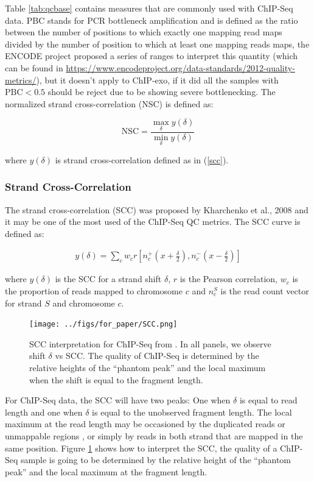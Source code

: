 \documentclass[11pt]{article}\usepackage[]{graphicx}\usepackage[]{color}
\begin{document}
Table \ref{tab:qcbase} contains measures that are commonly used with
ChIP-Seq data. PBC stands for PCR bottleneck amplification and is
defined as the ratio between the number of positions to which exactly
one mapping read maps divided by the number of position to which at
least one mapping reads maps, the ENCODE project proposed a series of
ranges to interpret this quantity (which can be found in
\url{https://www.encodeproject.org/data-standards/2012-quality-metrics/}),
but it doesn't apply to ChIP-exo, if it did all the samples with
$\mbox{PBC} < 0.5$ should be reject due to be showing severe
bottlenecking. The normalized strand cross-correlation (NSC) is
defined as:

\[
\mbox{NSC} = \frac{ \max_\delta y(\delta)}{\min_\delta y(\delta)}
\]

where $y(\delta)$ is strand cross-correlation defined as in (\ref{scc}). 

\subsubsection{Strand Cross-Correlation}
\label{sec:scc}

The strand cross-correlation (SCC) was proposed by Kharchenko et al.,
2008 \cite{strandcc} and it may be one of the most used of the
ChIP-Seq QC metrics. The SCC curve is defined as:

\begin{align}
  y(\delta) = \sum_c w_c r\left[ n_c^+ \left(x + \frac{\delta}{2}
    \right), n_c^- \left( x- \frac{\delta}{2} \right)\right]
\label{scc}
\end{align}

where $y(\delta)$ is the SCC for a strand shift $\delta$, $r$ is the
Pearson correlation, $w_c$ is the proportion of reads mapped to
chromosome $c$ and $n_c^S$ is the read count vector for strand $S$ and
chromosome $c$.

\begin{figure}[H]
  \centering
  \texttt{[image: ../figs/for\_paper/SCC.png]}
  \caption{SCC interpretation for ChIP-Seq from \cite{encode_qc}. In
    all panels, we observe shift $\delta$ vs SCC. The quality of
    ChIP-Seq is determined by the relative heights of the ``phantom
    peak'' and the local maximum when the shift is equal to the
    fragment length.}
  \label{fig:scc_landt}
\end{figure}

For ChIP-Seq data, the SCC will have two peaks: One when $\delta$ is
equal to read length and one when $\delta$ is equal to the unobserved
fragment length. The local maximum at the read length may be
occasioned by the duplicated reads or unmappable regions
\cite{carroll.qc}, or simply by reads in both strand that are mapped
in the same position. Figure \ref{fig:scc_landt} shows how to
interpret the SCC, the quality of a ChIP-Seq sample is going to be
determined by the relative height of the ``phantom peak'' and the
local maximum at the fragment length.
\end{document}
